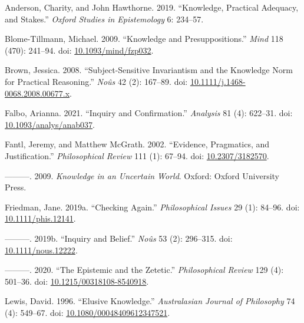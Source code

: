 \documentclass[
  11pt,
  letterpaper,
  DIV=11,
  numbers=noendperiod,
  twoside]{scrartcl}
\newlength{\cslhangindent}
\newenvironment{CSLReferences}[2] %
 {\begin{list}{}{%
  \setlength{\itemindent}{0pt}
  \setlength{\leftmargin}{0pt}
  \setlength{\parsep}{0pt}
  \ifodd #1
   \setlength{\leftmargin}{\cslhangindent}
   \setlength{\itemindent}{-1\cslhangindent}
  \fi
  \setlength{\itemsep}{#2\baselineskip}}}
 {\end{list}}
\begin{document}
\protect{}\label{refs}
\begin{CSLReferences}{1}{0}
Anderson, Charity, and John Hawthorne. 2019. {``Knowledge, Practical
Adequacy, and Stakes.''} \emph{Oxford Studies in Epistemology} 6:
234--57.

Blome-Tillmann, Michael. 2009. {``Knowledge and Presuppositions.''}
\emph{Mind} 118 (470): 241--94. doi:
\href{https://doi.org/10.1093/mind/fzp032}{10.1093/mind/fzp032}.

Brown, Jessica. 2008. {``Subject-Sensitive Invariantism and the
Knowledge Norm for Practical Reasoning.''} \emph{No{û}s} 42 (2):
167--89. doi:
\href{https://doi.org/10.1111/j.1468-0068.2008.00677.x}{10.1111/j.1468-0068.2008.00677.x}.

Falbo, Arianna. 2021. {``Inquiry and Confirmation.''} \emph{Analysis} 81
(4): 622--31. doi:
\href{https://doi.org/10.1093/analys/anab037}{10.1093/analys/anab037}.

Fantl, Jeremy, and Matthew McGrath. 2002. {``Evidence, Pragmatics, and
Justification.''} \emph{Philosophical Review} 111 (1): 67--94. doi:
\href{https://doi.org/10.2307/3182570}{10.2307/3182570}.

---------. 2009. \emph{Knowledge in an Uncertain World}. Oxford: Oxford
University Press.

Friedman, Jane. 2019a. {``Checking Again.''} \emph{Philosophical Issues}
29 (1): 84--96. doi:
\href{https://doi.org/10.1111/phis.12141}{10.1111/phis.12141}.

---------. 2019b. {``Inquiry and Belief.''} \emph{No{û}s} 53 (2):
296--315. doi:
\href{https://doi.org/10.1111/nous.12222}{10.1111/nous.12222}.

---------. 2020. {``The Epistemic and the Zetetic.''}
\emph{Philosophical Review} 129 (4): 501--36. doi:
\href{https://doi.org/10.1215/00318108-8540918}{10.1215/00318108-8540918}.

Lewis, David. 1996. {``Elusive Knowledge.''} \emph{Australasian Journal
of Philosophy} 74 (4): 549--67. doi:
\href{https://doi.org/10.1080/00048409612347521}{10.1080/00048409612347521}.


\end{CSLReferences}
\end{document}

